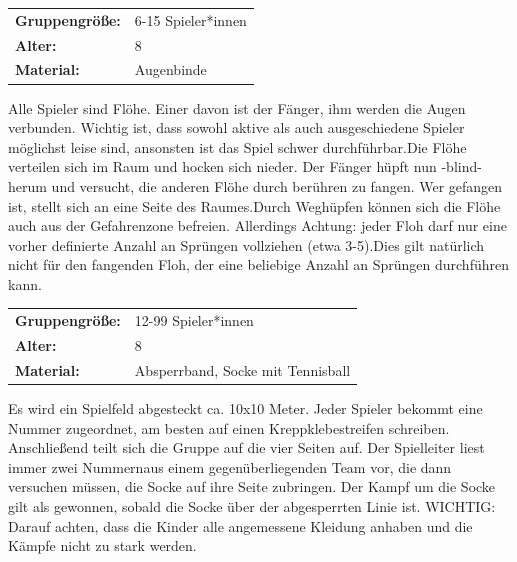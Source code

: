 
\begin{table}[H]
\begin{tabular}{>{\bfseries}lp{8cm}}
   Gruppengröße:   & 6-15 Spieler*innen\\
    Alter: & 8 \\
    Material: & Augenbinde \\
\end{tabular}
\end{table} 

Alle Spieler sind Flöhe. Einer davon ist der Fänger, ihm werden die Augen verbunden. Wichtig ist, dass sowohl aktive als auch ausgeschiedene Spieler möglichst leise sind, ansonsten ist das Spiel schwer durchführbar.Die Flöhe verteilen sich im Raum und hocken sich nieder. Der Fänger hüpft nun -blind-herum und versucht, die anderen Flöhe durch berühren zu fangen. Wer gefangen ist, stellt sich an eine Seite des Raumes.Durch Weghüpfen können sich die Flöhe auch aus der Gefahrenzone befreien. Allerdings Achtung: jeder Floh darf nur eine vorher definierte Anzahl an Sprüngen vollziehen (etwa 3-5).Dies gilt natürlich nicht für den fangenden Floh, der eine beliebige Anzahl an Sprüngen durchführen kann. \\



\begin{table}[H]
\begin{tabular}{>{\bfseries}lp{8cm}}
   Gruppengröße:   & 12-99 Spieler*innen\\
    Alter: & 8 \\
    Material: & Absperrband, Socke mit Tennisball \\
\end{tabular}
\end{table} 
 Es wird ein Spielfeld abgesteckt ca. 10x10 Meter. Jeder Spieler bekommt eine Nummer zugeordnet, am besten auf einen Kreppklebestreifen schreiben. Anschließend teilt sich die Gruppe auf die vier Seiten auf. Der Spielleiter liest immer zwei Nummernaus einem gegenüberliegenden Team vor, die dann versuchen müssen, die Socke auf ihre Seite zubringen.  Der Kampf um die Socke gilt als gewonnen, sobald die Socke über der abgesperrten Linie ist. 
WICHTIG: Darauf achten, dass die Kinder alle angemessene Kleidung anhaben und die Kämpfe nicht zu stark werden.\\



